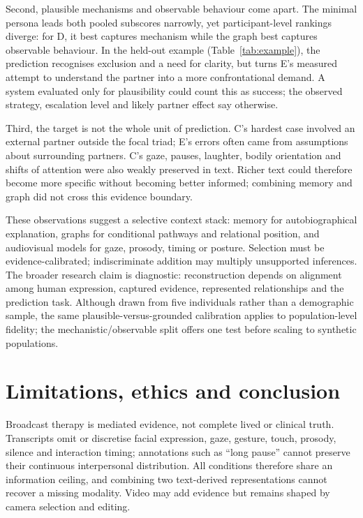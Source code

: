 \documentclass{article}
\begin{document}
Second, plausible mechanisms and observable behaviour come apart. The minimal persona leads
both pooled subscores narrowly, yet participant-level rankings diverge: for D, it best captures
mechanism while the graph best captures observable behaviour. In the held-out example
(Table~\ref{tab:example}), the prediction recognises exclusion and a need for clarity, but turns
E's measured attempt to understand the partner into a more confrontational demand. A system
evaluated only for plausibility could count this as success; the observed strategy, escalation level
and likely partner effect say otherwise.

Third, the target is not the whole unit of prediction. C's hardest case involved an external partner
outside the focal triad; E's errors often came from assumptions about surrounding partners.
C's gaze, pauses, laughter, bodily orientation and shifts of attention were also weakly preserved
in text. Richer text could therefore become more specific without becoming better informed;
combining memory and graph did not cross this evidence boundary.

These observations suggest a selective context stack: memory for autobiographical explanation,
graphs for conditional pathways and relational position, and audiovisual models for gaze, prosody,
timing or posture. Selection must be evidence-calibrated; indiscriminate addition may multiply
unsupported inferences. The broader research claim is diagnostic: reconstruction depends on
alignment among human expression, captured evidence, represented relationships and the prediction
task. Although drawn from five individuals rather than a demographic sample, the same plausible-versus-grounded calibration applies to population-level fidelity; the mechanistic/observable split
offers one test before scaling to synthetic populations.

\section{Limitations, ethics and conclusion}

Broadcast therapy is mediated evidence, not complete lived or clinical truth. Transcripts omit or
discretise facial expression, gaze, gesture, touch, prosody, silence and interaction timing;
annotations such as ``long pause'' cannot preserve their continuous interpersonal distribution.
All conditions therefore share an information ceiling, and combining two text-derived
representations cannot recover a missing modality. Video may add evidence but remains shaped
by camera selection and editing.
\end{document}
